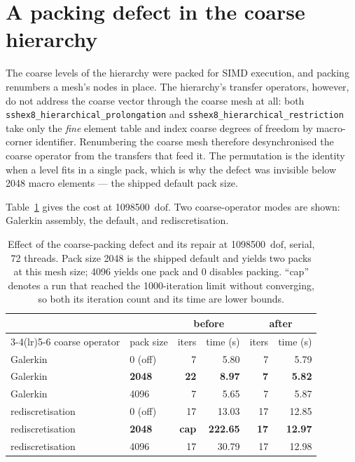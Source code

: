 \documentclass[11pt,a4paper]{article}
\newcommand{\dofs}{\ensuremath{\mathrm{dof}}}
\begin{document}
\section{A packing defect in the coarse hierarchy}

The coarse levels of the hierarchy were packed for SIMD execution, and packing
renumbers a mesh's nodes in place. The hierarchy's transfer operators, however,
do not address the coarse vector through the coarse mesh at all: both
\texttt{sshex8\_\allowbreak hierarchical\_\allowbreak prolongation} and
\texttt{sshex8\_\allowbreak hierarchical\_\allowbreak restriction} take only the \emph{fine} element
table and index coarse degrees of freedom by macro-corner identifier. Renumbering
the coarse mesh therefore desynchronised the coarse operator from the transfers
that feed it. The permutation is the identity when a level fits in a single pack,
which is why the defect was invisible below \num{2048} macro elements --- the
shipped default pack size.

Table~\ref{tab:fix} gives the cost at \num{1098500}~\dofs. Two coarse-operator
modes are shown: Galerkin assembly, the default, and rediscretisation.

\begin{table}[htbp]
\centering
\caption{Effect of the coarse-packing defect and its repair at
\num{1098500}~\dofs, serial, \num{72} threads. Pack size \num{2048} is the
shipped default and yields two packs at this mesh size; \num{4096} yields one
pack and \num{0} disables packing. ``cap'' denotes a run that reached the
\num{1000}-iteration limit without converging, so both its iteration count and
its time are lower bounds.}
\label{tab:fix}
\begin{tabular}{llrrrr}
\toprule
& & \multicolumn{2}{c}{before} & \multicolumn{2}{c}{after} \\
\cmidrule(lr){3-4}\cmidrule(lr){5-6}
coarse operator & pack size & iters & time (\si{\second}) & iters & time (\si{\second}) \\
\midrule
Galerkin          & 0 (off)        & 7    & 5.80   & 7  & 5.79 \\
Galerkin          & \textbf{2048}  & \textbf{22} & \textbf{8.97} & \textbf{7} & \textbf{5.82} \\
Galerkin          & 4096           & 7    & 5.65   & 7  & 5.87 \\
rediscretisation  & 0 (off)        & 17   & 13.03  & 17 & 12.85 \\
rediscretisation  & \textbf{2048}  & \textbf{cap} & \textbf{222.65} & \textbf{17} & \textbf{12.97} \\
rediscretisation  & 4096           & 17   & 30.79  & 17 & 12.98 \\
\bottomrule
\end{tabular}
\end{table}
\end{document}
